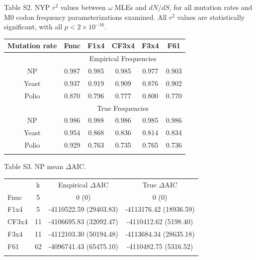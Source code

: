 \documentclass{pnastwo}
\begin{document}
\noindent Table S2. NYP $r^2$ values between $\omega$ MLEs and $dN/dS$, for all mutation rates and M0 codon frequency parameterizations examined. All $r^2$ values are statistically significant, with all $p < 2\times10^{-16}$.
\begin{table}[htbp]
	\begin{tabular}{c c c c c c}
		\hline\noalign{\smallskip}
		Mutation rate & Fnuc & F1x4 & CF3x4 & F3x4 & F61 \\
		\hline\noalign{\smallskip}
		& \multicolumn{5}{c}{Empirical Frequencies}\\
		\cline{2-6}\noalign{\medskip}
		NP & 0.987 & 0.985 & 0.985 & 0.977 & 0.903 \\ 
		Yeast & 0.937 & 0.919 & 0.909 & 0.876 & 0.902 \\ 
		Polio & 0.870 & 0.796 & 0.777 & 0.800 & 0.770 \\ 
		\hline\noalign{\medskip}
		& \multicolumn{5}{c}{True Frequencies}\\
		\cline{2-6}\noalign{\medskip}
		NP & 0.986 & 0.988 & 0.986 & 0.985 & 0.986 \\ 
		Yeast & 0.954 & 0.868 & 0.836 & 0.814 & 0.834 \\ 
		Polio & 0.929 & 0.763 & 0.735 & 0.765 & 0.736 \\ 
		\noalign{\smallskip}\hline\noalign{\smallskip}
	\end{tabular}
\end{table}	

\vspace{2cm}

\noindent Table S3. NP mean $\Delta$AIC.
\begin{table}[htbp]
	\begin{tabular}{l c c c}
		\hline\noalign{\smallskip}
		\multicolumn{1}{c}{Frequencies} & k & Empirical $\Delta$AIC & True $\Delta$AIC \\
		\noalign{\smallskip}\hline\noalign{\smallskip}
		Fnuc & 5 & 0 (0)  & 0 (0)  \\ 
		F1x4 & 5 & -4110522.59 (29403.83)  & -4113176.42 (18936.59)  \\ 
		CF3x4 & 11 & -4106695.83 (32092.47)  & -4110412.62 (5198.40)  \\ 
		F3x4 & 11 & -4112103.30 (50194.48)  & -4113684.34 (28635.18)  \\ 
		F61 & 62 & -4096741.43 (65475.10)  & -4110482.75 (5316.52)  \\ 
		\noalign{\smallskip}\hline\noalign{\smallskip} 
	\end{tabular}
\end{table}
\end{document}
